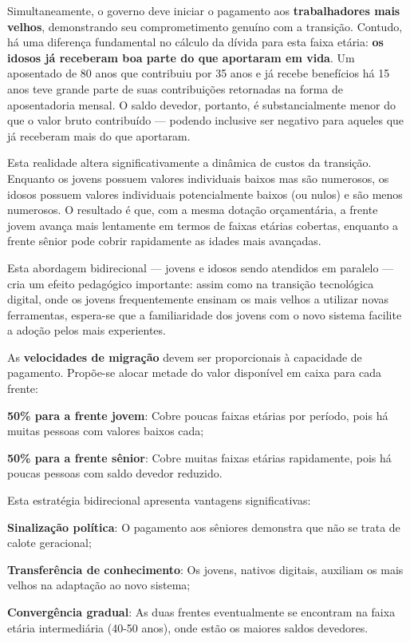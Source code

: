 Simultaneamente, o governo deve iniciar o pagamento aos \textbf{trabalhadores mais velhos}, demonstrando seu comprometimento genuíno com a transição. Contudo, há uma diferença fundamental no cálculo da dívida para esta faixa etária: \textbf{os idosos já receberam boa parte do que aportaram em vida}. Um aposentado de 80 anos que contribuiu por 35 anos e já recebe benefícios há 15 anos teve grande parte de suas contribuições retornadas na forma de aposentadoria mensal. O saldo devedor, portanto, é substancialmente menor do que o valor bruto contribuído --- podendo inclusive ser negativo para aqueles que já receberam mais do que aportaram.

Esta realidade altera significativamente a dinâmica de custos da transição. Enquanto os jovens possuem valores individuais baixos mas são numerosos, os idosos possuem valores individuais potencialmente baixos (ou nulos) e são menos numerosos. O resultado é que, com a mesma dotação orçamentária, a frente jovem avança mais lentamente em termos de faixas etárias cobertas, enquanto a frente sênior pode cobrir rapidamente as idades mais avançadas.

Esta abordagem bidirecional --- jovens e idosos sendo atendidos em paralelo --- cria um efeito pedagógico importante: assim como na transição tecnológica digital, onde os jovens frequentemente ensinam os mais velhos a utilizar novas ferramentas, espera-se que a familiaridade dos jovens com o novo sistema facilite a adoção pelos mais experientes.

As \textbf{velocidades de migração} devem ser proporcionais à capacidade de pagamento. Propõe-se alocar metade do valor disponível em caixa para cada frente:

\begin{alineas}
    \item \textbf{50\% para a frente jovem}: Cobre poucas faixas etárias por período, pois há muitas pessoas com valores baixos cada;
    \item \textbf{50\% para a frente sênior}: Cobre muitas faixas etárias rapidamente, pois há poucas pessoas com saldo devedor reduzido.
\end{alineas}

Esta estratégia bidirecional apresenta vantagens significativas:

\begin{alineas}
    \item \textbf{Sinalização política}: O pagamento aos sêniores demonstra que não se trata de calote geracional;
    \item \textbf{Transferência de conhecimento}: Os jovens, nativos digitais, auxiliam os mais velhos na adaptação ao novo sistema;
    \item \textbf{Convergência gradual}: As duas frentes eventualmente se encontram na faixa etária intermediária (40-50 anos), onde estão os maiores saldos devedores.
\end{alineas}

